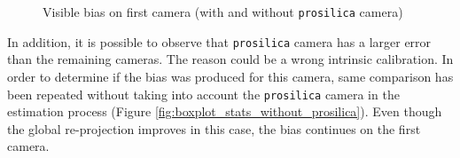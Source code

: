 \begin{figure}[!htbp]
 \centering
 \caption{Visible bias on first camera (with and without \texttt{prosilica} camera)}
\end{figure}

In addition, it is possible to observe that \texttt{prosilica} camera has a larger error than the remaining cameras. The reason could be a wrong intrinsic calibration. In order to determine if the bias was produced for this camera, same comparison has been repeated without taking into account the \texttt{prosilica} camera in the estimation process (Figure \ref{fig:boxplot_stats_without_prosilica}). Even though the global re-projection improves in this case, the bias continues on the first camera.




